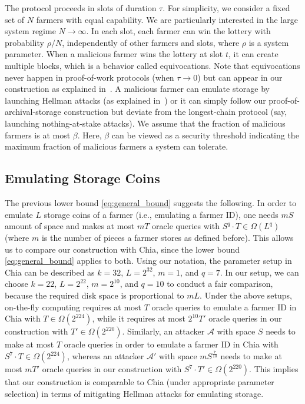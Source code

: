 \documentclass[conference]{IEEEtran}
\begin{document}
The protocol proceeds in slots of duration $\tau$. For simplicity, we consider a fixed set of $N$ farmers with equal capability. We
are particularly interested in the large system regime $N \to \infty$. In each slot, each farmer can win the lottery with probability $\rho / N$,
independently of other farmers and slots, where $\rho$ is a system parameter. When a malicious farmer wins the lottery at slot $t$, it can create multiple blocks, which is a behavior called equivocations. Note that equivocations never happen in proof-of-work protocols (when $\tau \to 0$) but can appear in our construction as explained in~\cite{blockchain_capacity}. 
A malicious farmer can emulate storage by launching Hellman attacks (as explained in~\cite{beyond_hellman}) or it can simply follow our proof-of-archival-storage construction but deviate from the longest-chain protocol (say, launching nothing-at-stake attacks).
We assume that the fraction of malicious farmers is at most $\beta$. Here, $\beta$ can be viewed as a security threshold indicating the maximum fraction of malicious farmers a system can tolerate.

\subsection{Emulating Storage Coins}

The previous lower bound \eqref{eq:general_bound} suggests the following. In order to emulate $L$ storage coins of a farmer (i.e., emulating a farmer ID), one needs $mS$
amount of space and makes at most $mT$ oracle queries with $S^q \cdot T \in \Omega\left(L^q \right)$ (where $m$ is the number of pieces a farmer stores as defined before). 
This allows us to compare our construction with Chia, since the lower bound \eqref{eq:general_bound} applies to both.
Using our notation, the parameter setup in Chia can be described as $k = 32$, $L = 2^{32}$, $m = 1$, and $q = 7$. 
In our setup, we can choose $k = 22$, $L = 2^{22}$, $m = 2^{10}$, and $q = 10$ to conduct a fair comparison, 
because the required disk space is proportional to $m L$.
Under the above setups, on-the-fly computing requires at most $T$ oracle queries to emulate a farmer ID in Chia with $T \in \Omega\left( 2^{224} \right)$,
while it requires at most $2^{10} T'$ oracle queries in our construction with $T' \in \Omega\left( 2^{220} \right)$. 
Similarly, an attacker $\mathcal{A}$ with space $S$ needs to make at most $T$
oracle queries in order to emulate  a farmer ID in Chia with $S^7 \cdot T \in \Omega\left( 2^{224}  \right)$, whereas an attacker $\mathcal{A}'$ with space $m {S}^{\frac{7}{10}}$
needs to make at most $m T'$ oracle queries in our construction with $S^7 \cdot T' \in \Omega\left( 2^{220}  \right)$.
This implies that our construction is comparable to Chia (under appropriate parameter selection) in terms of mitigating Hellman attacks for emulating storage.
\end{document}
